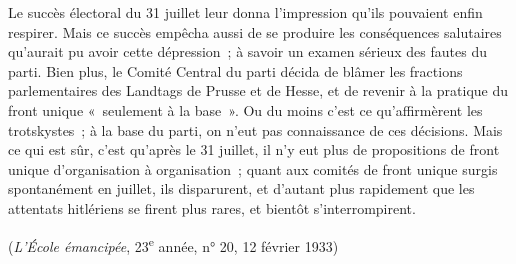 \documentclass[french,twoside]{book} %
\begin{document}
Le succès électoral du 31 juillet leur donna l'impression qu'ils pouvaient enfin respirer. Mais ce succès empêcha aussi de se produire les conséquences salutaires qu'aurait pu avoir cette dépression ; à savoir un examen sérieux des fautes du parti. Bien plus, le Comité Central du parti décida de blâmer les fractions parlementaires des Landtags de Prusse et de Hesse, et de revenir à la pratique du front unique « seulement à la base ». Ou du moins c'est ce qu'affirmèrent les trotskystes ; à la base du parti, on n'eut pas connaissance de ces décisions. Mais ce qui est sûr, c'est qu'après le 31 juillet, il n'y eut plus de propositions de front unique d'organisation à organisation ; quant aux comités de front unique surgis spontanément en juillet, ils disparurent, et d'autant plus rapidement que les attentats hitlériens se firent plus rares, et bientôt s'interrompirent.\par
({\itshape L'École émancipée}, 23\textsuperscript{e} année, n° 20, 12 février 1933)
\end{document}
